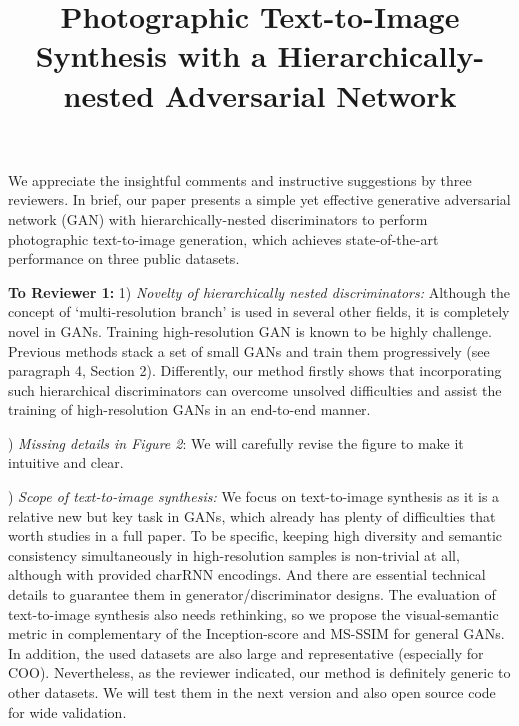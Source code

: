 \documentclass[10pt,twocolumn,letterpaper]{article}
\begin{document}
\title{Photographic Text-to-Image Synthesis with a Hierarchically-nested Adversarial Network}  %

\maketitle
\thispagestyle{empty}

\noindent
We appreciate the insightful comments and instructive suggestions by three reviewers. In brief, our paper presents a simple yet effective generative adversarial network (GAN) with hierarchically-nested discriminators to perform photographic text-to-image generation, which achieves state-of-the-art performance on three public datasets.

\noindent
\textbf{To Reviewer 1:} 1) \textit{Novelty of hierarchically nested discriminators:} Although the concept of `multi-resolution branch' is used in several other fields, it is completely novel in GANs. Training high-resolution GAN is known to be highly challenge. Previous methods stack a set of small GANs and train them progressively (see paragraph 4, Section 2). Differently, our method firstly shows that incorporating such hierarchical discriminators can overcome unsolved difficulties and assist the training of high-resolution GANs in an end-to-end manner. 

) \textit{Missing details in Figure 2}: We will carefully revise the figure to make it intuitive and clear.

) \textit{Scope of text-to-image synthesis:} We focus on text-to-image synthesis as it is a relative new but key task in GANs, which already has plenty of difficulties that worth studies in a full paper. To be specific, keeping high diversity and semantic consistency simultaneously in high-resolution samples is non-trivial at all, although with provided charRNN encodings. And there are essential technical details to guarantee them in generator/discriminator designs. 
The evaluation of text-to-image synthesis also needs rethinking, so we propose the visual-semantic metric in complementary of the Inception-score and MS-SSIM for general GANs. In addition, the used datasets are also large and representative (especially for COO). 
Nevertheless, as the reviewer indicated, our method is definitely generic to other datasets. We will test them in the next version and also open source code for wide validation.
\end{document}
